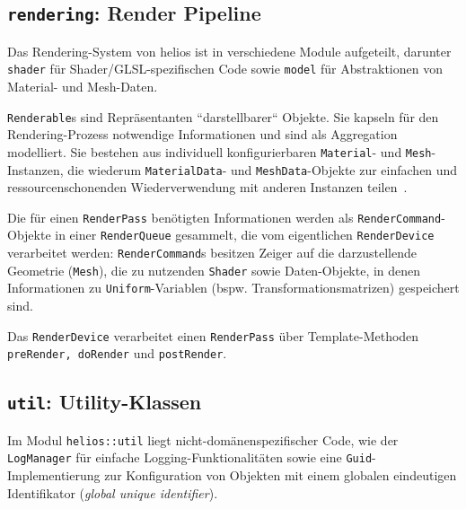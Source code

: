 \subsection*{\texttt{rendering}: Render Pipeline}
Das Rendering-System von helios ist in verschiedene Module aufgeteilt, darunter \texttt{shader} für Shader/GLSL-spezifischen Code sowie \texttt{model} für Abstraktionen von Material- und Mesh-Daten.\par
\texttt{Renderable}s sind Repräsentanten ``darstellbarer`` Objekte.
Sie kapseln für den Rendering-Prozess notwendige Informationen und sind als Aggregation modelliert.
Sie bestehen aus individuell konfigurierbaren \texttt{Material}- und \texttt{Mesh}-Instanzen, die wiederum \texttt{MaterialData}- und \texttt{MeshData}-Objekte zur einfachen und ressourcenschonenden Wiederverwendung mit anderen Instanzen teilen~\cite[126]{AHHP+18}.\par

Die für einen \texttt{RenderPass} benötigten Informationen werden als \texttt{RenderCommand}-Objekte in einer \texttt{RenderQueue} gesammelt, die vom eigentlichen \texttt{RenderDevice} verarbeitet werden: \texttt{RenderCommand}s besitzen Zeiger auf die darzustellende Geometrie (\texttt{Mesh}), die zu nutzenden \texttt{Shader} sowie Daten-Objekte, in denen Informationen zu \texttt{Uniform}-Variablen (bspw. Transformationsmatrizen) gespeichert sind.\par
Das \texttt{RenderDevice} verarbeitet einen \texttt{RenderPass} über Template-Methoden \texttt{preRender, doRender} und \texttt{postRender}.


\subsection*{\texttt{util}: Utility-Klassen}
Im Modul \texttt{helios::util} liegt nicht-domänenspezifischer Code, wie der \texttt{LogManager} für einfache Logging-Funktionalitäten sowie eine \texttt{Guid}-Implementierung zur Konfiguration von Objekten mit einem globalen eindeutigen Identifikator (\textit{global unique identifier}).